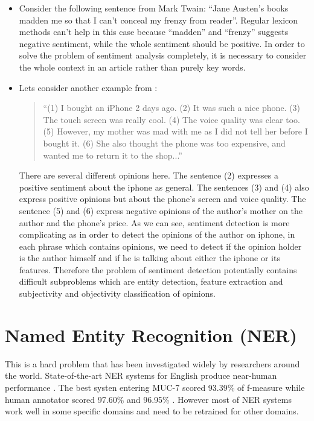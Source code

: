 \documentclass{article}
\begin{document}
  \begin{itemize}
    \item Consider the following sentence from Mark Twain: ``Jane Austen's books
madden me so that I can't conceal my frenzy from reader''. Regular lexicon
methods can't help in this case because ``madden'' and ``frenzy'' suggests
negative sentiment, while the whole sentiment should be positive. In order to
solve the problem of sentiment analysis completely, it is necessary to consider
the whole context in an article rather than purely key words.
    \item Lets consider another example from \citet{Liu2010}:
      \begin{quote}
        ``(1) I bought an iPhone 2 days ago. (2) It was such a nice
phone. (3) The touch screen was really cool. (4) The voice quality was clear
too. (5) However, my mother was mad with me as I did not tell her before I
bought it. (6) She also thought the phone was too expensive, and wanted me to
return it to the shop...''
      \end{quote}
      There are several different opinions here. The sentence (2) expresses
a positive sentiment about the iphone as general. The sentences (3) and
(4) also express positive opinions but about the phone's screen and voice
quality. The sentence (5) and (6) express negative opinions of the author's
mother on the author and the phone's price. As we can see, sentiment detection
is more complicating as in order to detect the opinions of the author on iphone,
in each phrase which contains opinions, we need to detect if the opinion holder
is the author himself and if he is talking about either the iphone or its
features. Therefore the problem of sentiment detection potentially contains
difficult subproblems which are entity detection, feature extraction
and subjectivity and objectivity classification of opinions.
  \end{itemize}

  \section{Named Entity Recognition (NER)}
    This is a hard problem that has been investigated widely by researchers
around the world. State-of-the-art NER systems for English produce near-human
performance \citet{Wikipedia_NER}. The best systen entering MUC-7 scored 93.39\%
of f-measure while human annotator scored 97.60\% and 96.95\% \citet{Marsh1998}.
However most of NER systems work well in some specific domains and need to be
retrained for other domains.
\end{document}
